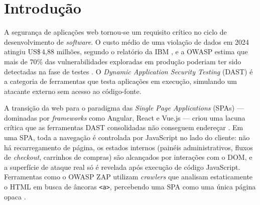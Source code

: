 \documentclass[
    10pt,
    twocolumn,
    a4paper
]{article}
\begin{document}
\begin{abstract}
Traditional Dynamic Application Security Testing (DAST) tools fail on
two critical fronts: they cannot navigate the internal states of Single
Page Applications (SPAs), and they cannot detect vulnerabilities requiring
semantic domain understanding, such as Business Logic, IDOR, stored XSS,
and JWT attacks. This paper proposes \textbf{Agentic DAST}, a framework
that integrates semantic reasoning from Large Language Models (LLMs) with
browser automation via Puppeteer and the Screenplay Pattern, operating
within an autonomous ReAct loop structured in four modules: Perception,
Cognitive, Executor, and Audit.
Empirical validation is conducted on OWASP Juice Shop through a
three-scenario comparative experiment (traditional ZAP, E2E-guided ZAP,
and autonomous Agentic DAST), evaluating Recall, Precision, and F1-Score
per vulnerability category. Results are expected to demonstrate that LLM
agents outperform traditional scanners in detecting semantic vulnerabilities
in SPAs, paving the way for integration into DevSecOps pipelines.

\bigskip\noindent
\textbf{Keywords:}
DAST, Single Page Application, LLM, Business Logic Vulnerability,
XSS, JWT, ReAct, Screenplay Pattern, OWASP Juice Shop.
\end{abstract}

\section{Introdução}

A segurança de aplicações web tornou-se um requisito crítico no ciclo de
desenvolvimento de \textit{software}. O custo médio de uma violação de
dados em 2024 atingiu US\$\,4,88 milhões, segundo o relatório da IBM
\cite{ibm2024}, e a OWASP estima que mais de 70\% das vulnerabilidades
exploradas em produção poderiam ter sido detectadas na fase de testes
\cite{owasp2021top10}. O \textit{Dynamic Application Security Testing}
(DAST) é a categoria de ferramentas que testa aplicações em execução,
simulando um atacante externo sem acesso ao código-fonte.

A transição da web para o paradigma das \textit{Single Page Applications}
(SPAs) --- dominadas por \textit{frameworks} como Angular, React e
Vue.js --- criou uma lacuna crítica que as ferramentas DAST consolidadas
não conseguem endereçar \cite{brightsec2024, stackhawk2024}. Em uma SPA,
toda a navegação é controlada por JavaScript no lado do cliente: não há
recarregamento de página, os estados internos (painéis administrativos,
fluxos de \textit{checkout}, carrinhos de compras) são alcançados por
interações com o DOM, e a superfície de ataque real só é revelada após
execução de código JavaScript. Ferramentas como o OWASP ZAP utilizam
\textit{crawlers} que analisam estaticamente o HTML em busca de âncoras
\texttt{<a>}, percebendo uma SPA como uma única página opaca
\cite{brightsec2024}.
\end{document}
